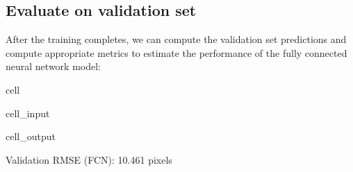 \documentclass[letterpaper,10pt,english]{jupyterBook}
\begin{document}
\subsection{Evaluate on validation set}
\label{\detokenize{04:evaluate-on-validation-set}}
\sphinxAtStartPar
After the training completes, we can compute the validation set predictions and compute appropriate metrics to estimate the performance of the fully connected neural network model:

\begin{sphinxuseclass}{cell}\begin{sphinxVerbatimInput}

\begin{sphinxuseclass}{cell_input}
\begin{sphinxVerbatim}[commandchars=\\\{\}]
 
      
    
  
    
  

\end{sphinxVerbatim}

\end{sphinxuseclass}\end{sphinxVerbatimInput}
\begin{sphinxVerbatimOutput}

\begin{sphinxuseclass}{cell_output}
\begin{sphinxVerbatim}[commandchars=\\\{\}]
Validation RMSE (FCN): 10.461 pixels
\end{sphinxVerbatim}

\end{sphinxuseclass}\end{sphinxVerbatimOutput}

\end{sphinxuseclass}
\end{document}
